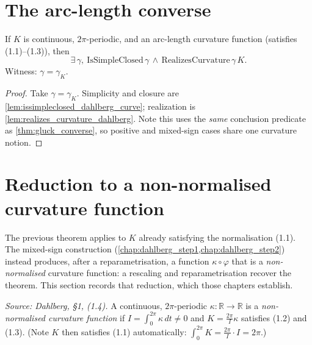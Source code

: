 \section{The arc-length converse}

\begin{theorem}


  \label{thm:arclength_converse}
  If $K$ is continuous, $2\pi$-periodic, and an arc-length curvature function
  (satisfies (1.1)--(1.3)), then
  \[
    \exists\,\gamma,\ \mathrm{IsSimpleClosed}\,\gamma \,\wedge\,
       \mathrm{RealizesCurvature}\,\gamma\,K.
  \]
  Witness: $\gamma=\gamma_K$.
\end{theorem}
\begin{proof}
  \leanok
  Take $\gamma=\gamma_K$. Simplicity and closure are
  \cref{lem:issimpleclosed_dahlberg_curve}; realization is
  \cref{lem:realizes_curvature_dahlberg}. Note this uses the \emph{same}
  conclusion predicate as \cref{thm:gluck_converse}, so positive and mixed-sign
  cases share one curvature notion.
\end{proof}

\section{Reduction to a non-normalised curvature function}

The previous theorem applies to $K$ already satisfying the normalisation (1.1).
The mixed-sign construction (\cref{chap:dahlberg_step1,chap:dahlberg_step2})
instead produces, after a reparametrisation, a function $\kappa\circ\varphi$ that
is a \emph{non-normalised} curvature function: a rescaling and reparametrisation
recover the theorem. This section records that reduction, which those chapters
establish.

\begin{definition}


  \label{def:non_normalised_curvature}
  \textit{Source: Dahlberg, §1, (1.4).}
  A continuous, $2\pi$-periodic $\kappa : \mathbb{R}\to\mathbb{R}$ is a
  \emph{non-normalised curvature function} if $I=\int_0^{2\pi}\kappa\,dt\neq 0$ and
  $K=\frac{2\pi}{I}\kappa$ satisfies (1.2) and (1.3). (Note $K$ then satisfies
  (1.1) automatically: $\int_0^{2\pi}K=\frac{2\pi}{I}\cdot I=2\pi$.)
\end{definition}

